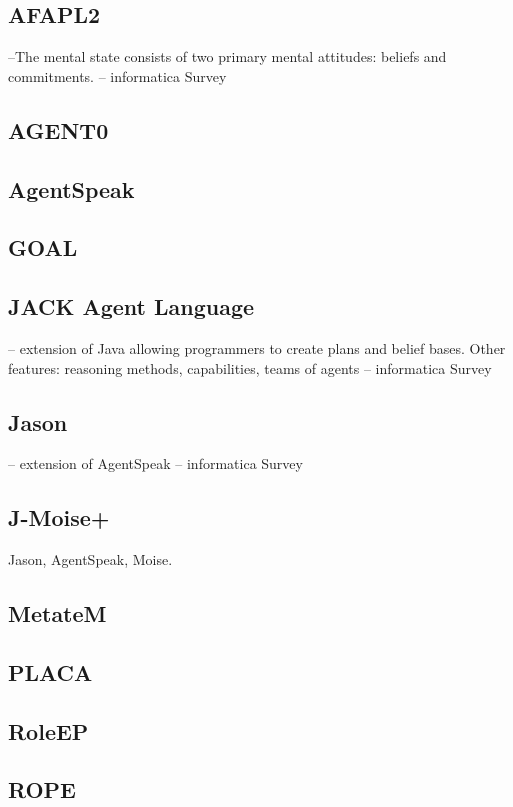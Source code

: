 \documentclass{article}
\begin{document}
\subsection{AFAPL2}

--The mental state consists of two primary mental attitudes: beliefs and 
commitments. -- informatica Survey

\subsection{AGENT0}
\subsection{AgentSpeak}
\subsection{GOAL}
\subsection{JACK Agent Language}

-- extension of Java allowing programmers to create plans and belief bases.
Other features: reasoning methods, capabilities, teams of agents -- informatica
Survey

\subsection{Jason}

-- extension of AgentSpeak -- informatica Survey

\subsection{J-Moise+}

Jason, AgentSpeak, Moise.

\subsection{MetateM}
\subsection{PLACA}
\subsection{RoleEP}
\subsection{ROPE}
\end{document}
